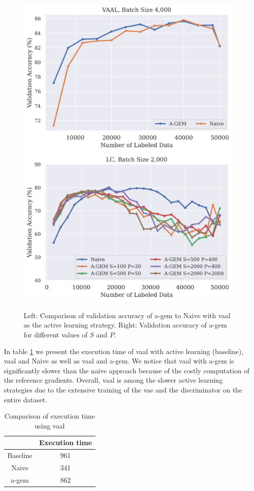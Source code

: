\begin{figure}[h]
    \centering
    \includegraphics[width=0.48\linewidth]{images/results_CAL/vaal_agem_naive.png} \hfill
    \includegraphics[width=0.48\linewidth]{images/results_CAL/agem_lc.png}
    \caption[Continual Active Learning with \gls{a-gem}]{Left: Comparison of validation accuracy of \gls{a-gem} to Naive with \gls{vaal} as the active learning strategy.
    Right: Validation accuracy of \gls{a-gem} for different values of $S$ and $P$.}
    \label{fig:Evaluation:Results:CAL:AGEM}
\end{figure}

In table \ref{fig:Evaluation:CAL:VAAL_AGEM_Time} we present the execution time of \gls{vaal} with active learning (baseline), \gls{vaal} and Naive as well as \gls{vaal}
and \gls{a-gem}. We notice that \gls{vaal} with \gls{a-gem} is significantly slower than the naive approach because of the costly computation of the reference
gradients. Overall, \gls{vaal} is among the slower active learning strategies due to the extensive training of the \gls{vae} and the discriminator on the
entire dataset. \par

\begin{table}[h]
    \centering
    \begin{tabular}{c | c } 
         & Execution time\\ 
        \hline 
        Baseline & 961 \\
        Naive & 341 \\
        \gls{a-gem} & 862 \\
    \end{tabular}
    \caption{Comparison of execution time using \gls{vaal}}
    \label{fig:Evaluation:CAL:VAAL_AGEM_Time}
\end{table}


